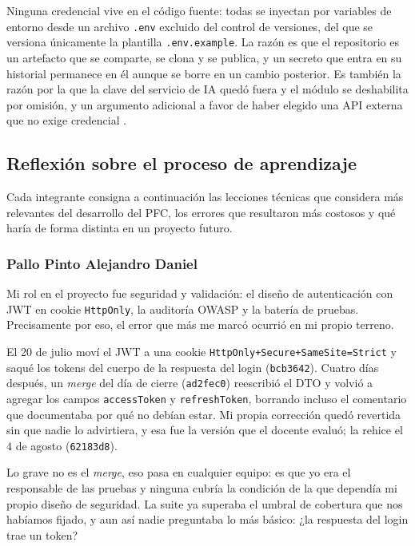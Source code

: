 \documentclass[12pt,a4paper]{article}
\begin{document}
Ninguna credencial vive en el código fuente: todas se inyectan por variables de entorno desde un
archivo \texttt{.env} excluido del control de versiones, del que se versiona únicamente la
plantilla \texttt{.env.example}. La razón es que el repositorio es un artefacto que se comparte,
se clona y se publica, y un secreto que entra en su historial permanece en él aunque se borre en
un cambio posterior. Es también la razón por la que la clave del servicio de IA quedó fuera y el
módulo se deshabilita por omisión, y un argumento adicional a favor de haber elegido una API
externa que no exige credencial \parencite{swebok2024}.

\subsection{Reflexión sobre el proceso de aprendizaje}

Cada integrante consigna a continuación las lecciones técnicas que considera más relevantes del
desarrollo del PFC, los errores que resultaron más costosos y qué haría de forma distinta en un
proyecto futuro.

\subsubsection*{Pallo Pinto Alejandro Daniel}

Mi rol en el proyecto fue seguridad y validación: el diseño de autenticación con JWT en cookie
\texttt{HttpOnly}, la auditoría OWASP y la batería de pruebas. Precisamente por eso, el error que
más me marcó ocurrió en mi propio terreno.

El 20 de julio moví el JWT a una cookie \texttt{HttpOnly+Secure+SameSite=Strict} y saqué los
tokens del cuerpo de la respuesta del login (\texttt{bcb3642}). Cuatro días después, un
\textit{merge} del día de cierre (\texttt{ad2fec0}) reescribió el DTO y volvió a agregar los
campos \texttt{accessToken} y \texttt{refreshToken}, borrando incluso el comentario que
documentaba por qué no debían estar. Mi propia corrección quedó revertida sin que nadie lo
advirtiera, y esa fue la versión que el docente evaluó; la rehice el 4 de agosto
(\texttt{62183d8}).

Lo grave no es el \textit{merge}, eso pasa en cualquier equipo: es que yo era el responsable de
las pruebas y ninguna cubría la condición de la que dependía mi propio diseño de seguridad. La
suite ya superaba el umbral de cobertura que nos habíamos fijado, y aun así nadie preguntaba lo
más básico: ¿la respuesta del login trae un token?
\end{document}
